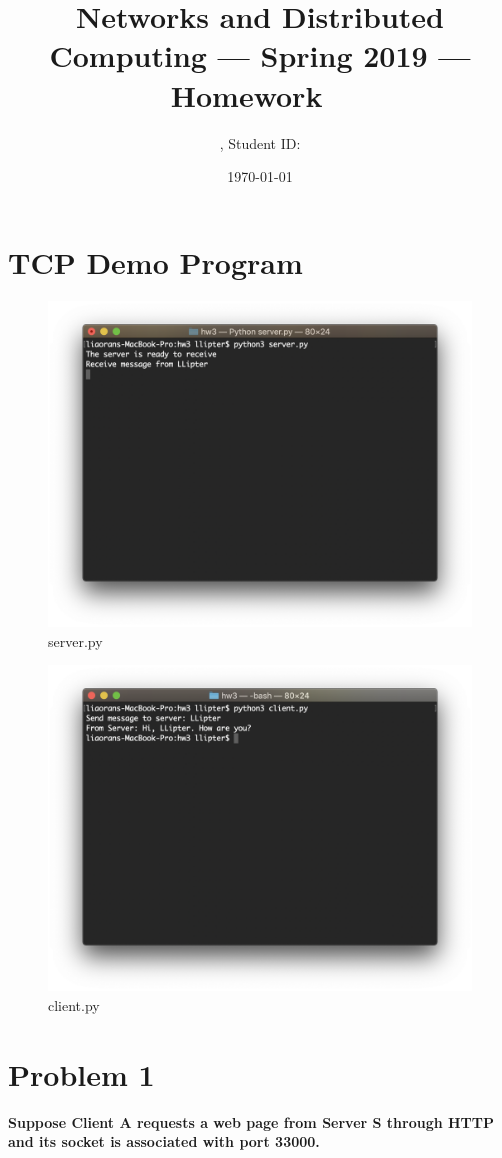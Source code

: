 \documentclass[11pt]{article}
\title{\Large Networks and Distributed Computing --- Spring 2019 --- Homework \Homework\ }
\author{\Name, Student ID: \SID}
\date{\today}
\begin{document}
\maketitle

\section{TCP Demo Program}

\begin{figure}[h]
\centering
\includegraphics[width=.5\textwidth]{server.png}
\caption{\label{fig:server}server.py}
\end{figure}

\begin{figure}[h]
\centering
\includegraphics[width=.5\textwidth]{client.png}
\caption{\label{fig:client}client.py}
\end{figure}

\newpage
\section{Problem 1}

\textbf{Suppose Client A requests a web page from Server S through HTTP and its socket is associated with port 33000.}
\end{document}
